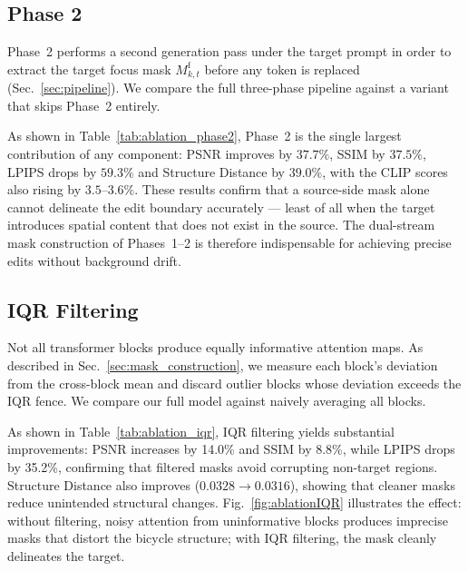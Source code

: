 \subsection{Phase 2}
\label{sec:ablation_phase2}

Phase~2 performs a second generation pass under the target prompt in order to
extract the target focus mask $M_{k,t}^{\mathrm{f}}$ before any token is replaced
(Sec.~\ref{sec:pipeline}). We compare the full three-phase pipeline against a
variant that skips Phase~2 entirely.



As shown in Table~\ref{tab:ablation_phase2}, Phase~2 is the single largest
contribution of any component: PSNR improves by $37.7\%$, SSIM by $37.5\%$,
LPIPS drops by $59.3\%$ and Structure Distance by $39.0\%$, with the CLIP scores
also rising by $3.5$--$3.6\%$. These results confirm that a source-side mask alone
cannot delineate the edit boundary accurately --- least of all when the target
introduces spatial content that does not exist in the source. The dual-stream
mask construction of Phases~1--2 is therefore indispensable for achieving precise
edits without background drift.

\subsection{IQR Filtering}
\label{sec:ablation_iqr}

Not all transformer blocks produce equally informative attention maps. As described in Sec.~\ref{sec:mask_construction}, we measure each block's deviation from the cross-block mean and discard outlier blocks whose deviation exceeds the IQR fence. We compare our full model against naively averaging all blocks.




As shown in Table~\ref{tab:ablation_iqr}, IQR filtering yields substantial improvements: PSNR increases by 14.0\% and SSIM by 8.8\%, while LPIPS drops by 35.2\%, confirming that filtered masks avoid corrupting non-target regions. Structure Distance also improves ($0.0328 \to 0.0316$), showing that cleaner masks reduce unintended structural changes. Fig.~\ref{fig:ablationIQR} illustrates the effect: without filtering, noisy attention from uninformative blocks produces imprecise masks that distort the bicycle structure; with IQR filtering, the mask cleanly delineates the target.

